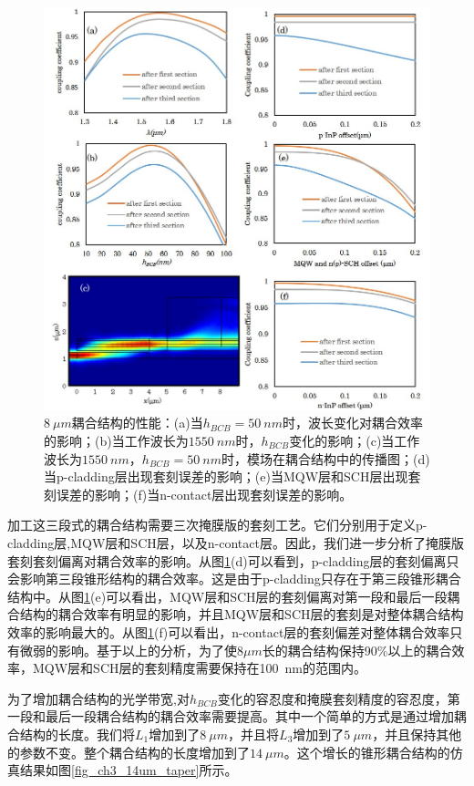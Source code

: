 \begin{figure}[htb]
	\centering
	\includegraphics[width=14cm]{./Pictures/fig_ch3_8um_taper.jpg}
	\caption{$8~\mu m$耦合结构的性能：(a)当$h_{BCB}=50~nm$时，波长变化对耦合效率的影响；(b)当工作波长为$1550~nm$时，$h_{BCB}$变化的影响；(c)当工作波长为$1550~nm$，$h_{BCB}=50~nm$时，模场在耦合结构中的传播图；(d)当p-cladding层出现套刻误差的影响；(e)当MQW层和SCH层出现套刻误差的影响；(f)当n-contact层出现套刻误差的影响。}
	\label{fig_ch3_8um_taper}
\end{figure}

加工这三段式的耦合结构需要三次掩膜版的套刻工艺。它们分别用于定义p-cladding层,MQW层和SCH层，以及n-contact层。因此，我们进一步分析了掩膜版套刻套刻偏离对耦合效率的影响。从图\ref{fig_ch3_8um_taper}(d)可以看到，p-cladding层的套刻偏离只会影响第三段锥形结构的耦合效率。这是由于p-cladding只存在于第三段锥形耦合结构中。从图\ref{fig_ch3_8um_taper}(e)可以看出，MQW层和SCH层的套刻偏离对第一段和最后一段耦合结构的耦合效率有明显的影响，并且MQW层和SCH层的套刻是对整体耦合结构效率的影响最大的。从图\ref{fig_ch3_8um_taper}(f)可以看出，n-contact层的套刻偏差对整体耦合效率只有微弱的影响。基于以上的分析，为了使$8 \mu m$长的耦合结构保持90\%以上的耦合效率，MQW层和SCH层的套刻精度需要保持在100~nm的范围内。

为了增加耦合结构的光学带宽,对$h_{BCB}$变化的容忍度和掩膜套刻精度的容忍度，第一段和最后一段耦合结构的耦合效率需要提高。其中一个简单的方式是通过增加耦合结构的长度。我们将$L_1$增加到了$8~\mu m$，并且将$L_3$增加到了$5~\mu m$，并且保持其他的参数不变。整个耦合结构的长度增加到了$14~\mu m$。这个增长的锥形耦合结构的仿真结果如图\ref{fig_ch3_14um_taper}所示。

